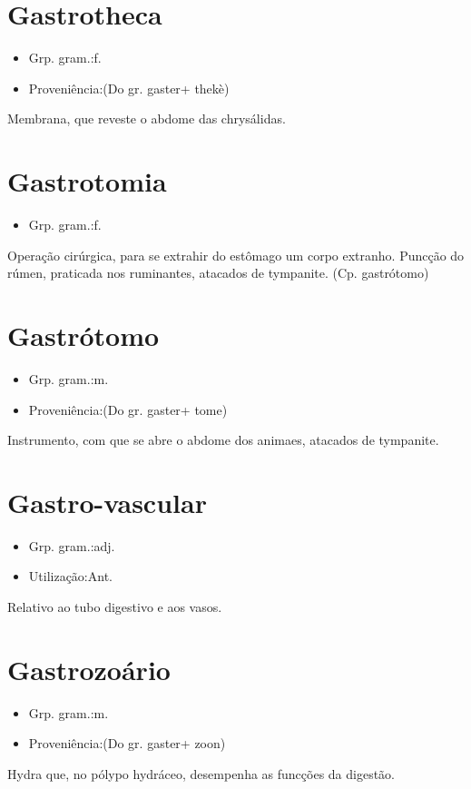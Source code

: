 \section{Gastrotheca}
\begin{itemize}
\item {Grp. gram.:f.}
\end{itemize}
\begin{itemize}
\item {Proveniência:(Do gr. \textunderscore gaster\textunderscore  + \textunderscore thekè\textunderscore )}
\end{itemize}
Membrana, que reveste o abdome das chrysálidas.
\section{Gastrotomia}
\begin{itemize}
\item {Grp. gram.:f.}
\end{itemize}
Operação cirúrgica, para se extrahir do estômago um corpo extranho.
Puncção do rúmen, praticada nos ruminantes, atacados de tympanite.
(Cp. \textunderscore gastrótomo\textunderscore )
\section{Gastrótomo}
\begin{itemize}
\item {Grp. gram.:m.}
\end{itemize}
\begin{itemize}
\item {Proveniência:(Do gr. \textunderscore gaster\textunderscore  + \textunderscore tome\textunderscore )}
\end{itemize}
Instrumento, com que se abre o abdome dos animaes, atacados de tympanite.
\section{Gastro-vascular}
\begin{itemize}
\item {Grp. gram.:adj.}
\end{itemize}
\begin{itemize}
\item {Utilização:Ant.}
\end{itemize}
Relativo ao tubo digestivo e aos vasos.
\section{Gastrozoário}
\begin{itemize}
\item {Grp. gram.:m.}
\end{itemize}
\begin{itemize}
\item {Proveniência:(Do gr. \textunderscore gaster\textunderscore  + \textunderscore zoon\textunderscore )}
\end{itemize}
Hydra que, no pólypo hydráceo, desempenha as funcções da digestão.
